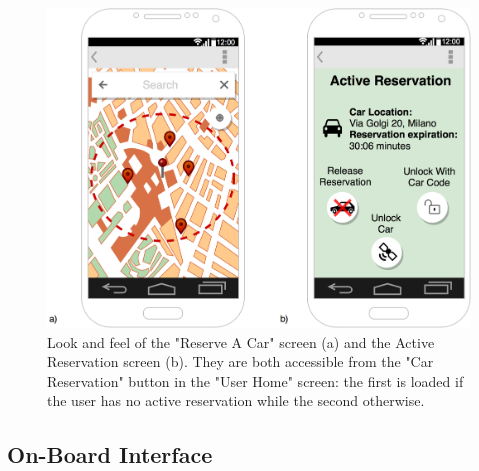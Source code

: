 \begin{figure}[h]
\centering
		\includegraphics[width=\textwidth]{./user_interface_design/diagrams/mobile_res_unlock.png}
		\caption{Look and feel of the "Reserve A Car" screen (a) and the Active Reservation screen (b). They are both accessible from the "Car Reservation" button in the "User Home" screen: the first is loaded if the user has no active reservation while the second otherwise.}
		\label{mobile_res_unlock}
\end{figure}

\subsection{On-Board Interface}